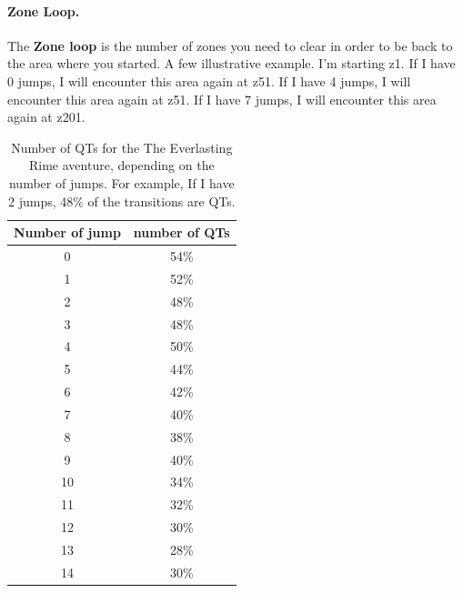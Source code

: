 \documentclass{article}
\begin{document}
\paragraph{Zone Loop.}
The \textbf{Zone loop} is the number of zones you need to clear in order to be back to the area where you started.
A few illustrative example.
I'm starting z1.
If I have 0 jumps, I will encounter this area again at z51.
If I have 4 jumps, I will encounter this area again at z51.
If I have 7 jumps, I will encounter this area again at z201.


\begin{table}[ht!]
\centering
\caption{Number of QTs for the The Everlasting Rime aventure, depending on the number of jumps.
For example, If I have 2 jumps, 48\% of the transitions are QTs.
}
\label{tbl:tallTaleQts}
\begin{small}
\begin{tabular}{ c | c }
\toprule
Number of jump & number of QTs \\
\midrule
0 & 54\% \\
1 & 52\% \\
2 & 48\% \\
3 & 48\% \\
4 & 50\% \\
5 & 44\% \\
6 & 42\% \\
7 & 40\% \\
8 & 38\% \\
9 & 40\% \\
10 & 34\% \\
11 & 32\% \\
12 & 30\% \\
13 & 28\% \\
14 & 30\% \\
\bottomrule
\end{tabular}
\end{small}
\end{table}
\end{document}
